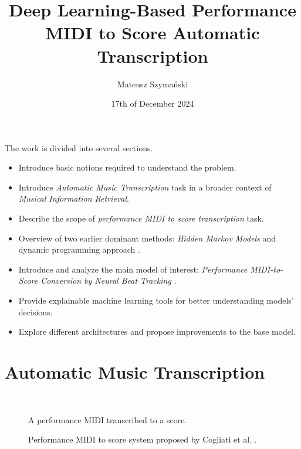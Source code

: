 \documentclass[a4paper, 9pt]{beamer}
\title{Deep Learning-Based Performance MIDI to Score Automatic Transcription}
\author{Mateusz Szymański}
\institute{University of Warsaw \\ Faculty of Mathematics, Informatics and Mechanics}
\date{17th of December 2024}
\begin{document}
\begin{frame}
\titlepage
\end{frame}

\begin{frame}
The work is divided into several sections.\pause
\begin{itemize}
	\item Introduce basic notions required to understand the problem.\pause
	\item Introduce \emph{Automatic Music Transcription} task in a broader context of \emph{Musical Information Retrieval}.\pause
	\item Describe the scope of \emph{performance MIDI to score transcription} task.\pause
	\item Overview of two earlier dominant methods:  \emph{Hidden Markov Models} \cite{Takeda2002} and dynamic programming approach \cite{Yang2005}.\pause
	\item Introduce and analyze the main model of interest: \emph{Performance MIDI-to-Score Conversion by Neural Beat Tracking} \cite{Liu2022}.\pause
	\item Provide explainable machine learning tools for better understanding models' decisions.\pause
	\item Explore different architectures and propose improvements to the base model.
\end{itemize}
\end{frame}

\section{Automatic Music Transcription}

\begin{frame}
\begin{figure}[ht!]
\centering
\pause \\ 

\caption{A performance MIDI transcribed to a score.}
\end{figure}
\end{frame}

\begin{frame}
\begin{figure}[ht!]
\centering
\scalebox{0.75}{}
\caption{Performance MIDI to score system proposed by Cogliati et al. \cite{Cogliati2016}.}
\end{figure}
\end{frame}
\end{document}
